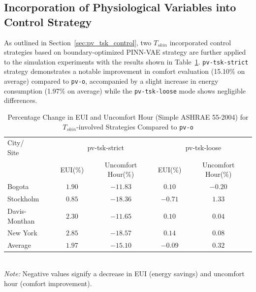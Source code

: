 \subsection{Incorporation of Physiological Variables into Control Strategy}
\label{sec:tsk_results}
As outlined in Section~\ref{sec:pv_tsk_control}, two $T_{skin}$ incorporated control strategies based on boundary-optimized PINN-VAE strategy are further applied to the simulation experiments with the results shown in Table~\ref{tab:pv_tsk_results}. \texttt{pv-tsk-strict} strategy demonstrates a notable improvement in comfort evaluation (15.10\% on average) compared to \texttt{pv-o}, accompanied by a slight increase in energy consumption (1.97\% on average) while the \texttt{pv-tsk-loose} mode shows negligible differences.

\begin{table}[htbp]
\begin{center}
\small
\caption{Percentage Change in EUI and Uncomfort Hour (Simple ASHRAE 55-2004) for $T_{skin}$-involved Strategies Compared to \texttt{pv-o}}
\label{tab:pv_tsk_results}
\vspace{0.5em}
\setlength{\tabcolsep}{6pt} %
\begin{tabular}{lcc|cc}
\toprule
\makecell[l]{City/\\Site} 
& \multicolumn{2}{c|}{pv-tsk-strict} 
& \multicolumn{2}{c}{pv-tsk-loose} \\
\cmidrule(lr){2-3} \cmidrule(lr){4-5}
& EUI(\%) & Uncomfort Hour(\%) & EUI(\%) & Uncomfort Hour(\%) \\
\midrule
Bogota        & $1.90$ & $-11.83$ & $0.10$ & $-0.20$ \\
Stockholm     & $0.85$ & $-18.36$ & $-0.71$ & $1.33$ \\
Davis-Monthan & $2.30$ & $-11.65$ & $0.10$ & $0.04$  \\
New York      & $2.85$ & $-18.57$ & $0.14$ & $0.08$  \\
\midrule
Average       & $1.97$ & $-15.10$ & $-0.09$ & $0.32$ \\
\bottomrule
\end{tabular}
\vspace{0.5em} \\
\footnotesize
\textit{Note:} Negative values signify a decrease in EUI (energy savings) and uncomfort hour (comfort improvement).
\end{center}
\end{table}

